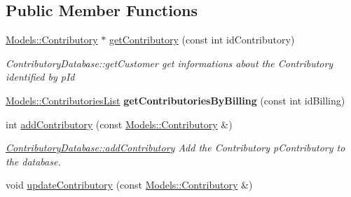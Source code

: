 \subsection*{Public Member Functions}
\begin{DoxyCompactItemize}
\item 
\hyperlink{classModels_1_1Contributory}{Models\-::\-Contributory} $\ast$ \hyperlink{classDatabases_1_1ContributoryDatabase_a76b6541c4b770a51b8d1a449631a5ffd}{get\-Contributory} (const int id\-Contributory)
\begin{DoxyCompactList}\small\item\em Contributory\-Database\-::get\-Customer get informations about the Contributory identified by {\itshape p\-Id} \end{DoxyCompactList}\item 
\hypertarget{classDatabases_1_1ContributoryDatabase_a9d2a5e5322fa50ecd6e4b89f1102cb9b}{\hyperlink{classModels_1_1ContributoriesList}{Models\-::\-Contributories\-List} {\bfseries get\-Contributories\-By\-Billing} (const int id\-Billing)}\label{classDatabases_1_1ContributoryDatabase_a9d2a5e5322fa50ecd6e4b89f1102cb9b}

\item 
int \hyperlink{classDatabases_1_1ContributoryDatabase_abd7bf49a62d8e267d898936122b5c2a7}{add\-Contributory} (const \hyperlink{classModels_1_1Contributory}{Models\-::\-Contributory} \&)
\begin{DoxyCompactList}\small\item\em \hyperlink{classDatabases_1_1ContributoryDatabase_abd7bf49a62d8e267d898936122b5c2a7}{Contributory\-Database\-::add\-Contributory} Add the Contributory {\itshape p\-Contributory} to the database. \end{DoxyCompactList}\item 
\hypertarget{classDatabases_1_1ContributoryDatabase_a748062c6793dd80115ded9bffba75b6a}{void \hyperlink{classDatabases_1_1ContributoryDatabase_a748062c6793dd80115ded9bffba75b6a}{update\-Contributory} (const \hyperlink{classModels_1_1Contributory}{Models\-::\-Contributory} \&)}\label{classDatabases_1_1ContributoryDatabase_a748062c6793dd80115ded9bffba75b6a}


\end{DoxyCompactItemize}
